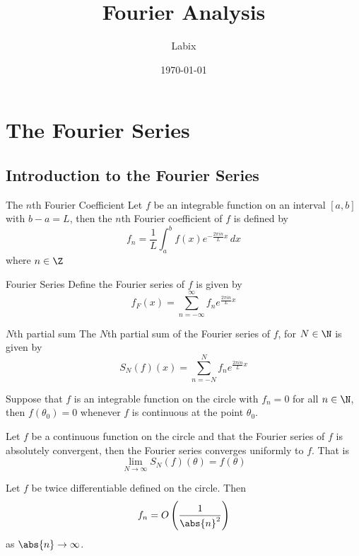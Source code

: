 \documentclass[a4paper]{article}
\title{Fourier Analysis}
\author{Labix}
\date{\today}
\begin{document}
\maketitle
\begin{abstract}
\end{abstract}
\tableofcontents
\pagebreak

\section{The Fourier Series}
\subsection{Introduction to the Fourier Series}
\begin{defn}{The $n$th Fourier Coefficient}{} Let $f$ be an integrable function on an interval $[a,b]$ with $b-a=L$, then the $n$th Fourier coefficient of $f$ is defined by $$f_n=\frac{1}{L}\int_a^bf(x)e^{-\frac{2\pi in}{L}x}\,dx$$ where $n\in\Z$
\end{defn}

\begin{defn}{Fourier Series}{} Define the Fourier series of $f$ is given by $$f_F(x)=\sum_{n=-\infty}^\infty f_ne^{\frac{2\pi in}{L}x}$$
\end{defn}

\begin{defn}{$N$th partial sum}{} The $N$th partial sum of the Fourier series of $f$, for $N\in\N$ is given by $$S_N(f)(x)=\sum_{n=-N}^N f_ne^{\frac{2\pi in}{L}x}$$
\end{defn}

\begin{thm}{}{} Suppose that $f$ is an integrable function on the circle with $f_n=0$ for all $n\in\N$, then $f(\theta_0)=0$ whenever $f$ is continuous at the point $\theta_0$. 
\end{thm}

\begin{crl}{}{} Let $f$ be a continuous function on the circle and that the Fourier series of $f$ is absolutely convergent, then the Fourier series converges uniformly to $f$. That is $$\lim_{N\to\infty}S_N(f)(\theta)=f(\theta)$$
\end{crl}

\begin{crl}{}{} Let $f$ be twice differentiable defined on the circle. Then $$f_n=O\left(\frac{1}{\abs{n}^2}\right)$$ as $\abs{n}\to\infty$. 
\end{crl}
\end{document}
